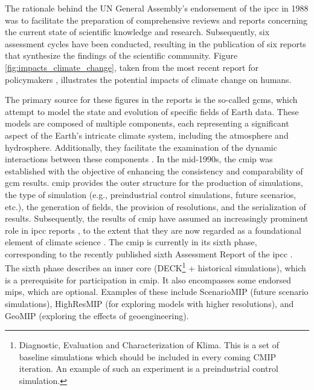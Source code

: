 The rationale behind the UN General Assembly's endorsement of the \ac{ipcc} in 1988 was to facilitate the preparation of comprehensive reviews and reports concerning the current state of scientific knowledge and research. 
Subsequently, six assessment cycles have been conducted, resulting in the publication of six reports that synthesize the findings of the scientific community. 
Figure \ref{fig:impacts_climate_change}, taken from the most recent report for policymakers \cite{lee2024climate}, illustrates the potential impacts of climate change on humans.

The primary source for these figures in the reports is the so-called \acp{gcm}, which attempt to model the state and evolution of specific fields of Earth data.
These models are composed of multiple components, each representing a significant aspect of the Earth's intricate climate system, including the atmosphere and hydrosphere. 
Additionally, they facilitate the examination of the dynamic interactions between these components \cite{vietinghoffdiss}.  
In the mid-1990s, the \ac{cmip} was established with the objective of enhancing the consistency and comparability of \ac{gcm} results. 
\ac{cmip} provides the outer structure for the production of simulations, the type of simulation (e.g., preindustrial control simulations, future scenarios, etc.), the generation of fields, the provision of resolutions, and the serialization of results.
Subsequently, the results of \ac{cmip} have assumed an increasingly prominent role in \ac{ipcc} reports \cite{touzepeiffer_coupled_2020}, to the extent that they are now regarded as a foundational element of climate science \cite{eyring_overview_2016}. 
The \ac{cmip} is currently in its sixth phase, corresponding to the recently published sixth Assessment Report of the \ac{ipcc} \cite{lee2024climate}. 
The sixth phase describes an inner core (DECK\footnote{Diagnostic, Evaluation and Characterization of Klima. This is a set of baseline simulations which should be included in every coming CMIP iteration. An example of such an experiment is a preindustrial control simulation.} + historical simulations), which is a prerequisite for participation in \ac{cmip}. It also encompasses some endorsed \acp{mip}, which are optional. Examples of these include ScenarioMIP (future scenario simulations), HighResMIP (for exploring models with higher resolutions), and GeoMIP (exploring the effects of geoengineering). \cite{eyring_overview_2016}

